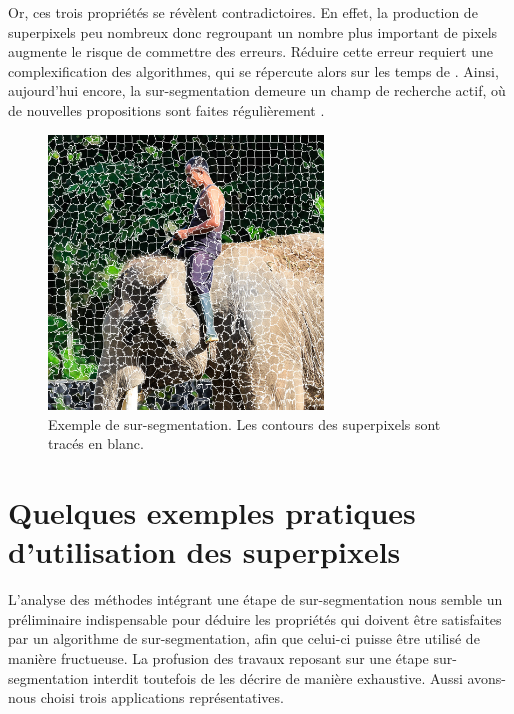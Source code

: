 Or, ces trois propriétés se révèlent contradictoires. En effet, la production de superpixels peu nombreux \modif{--} donc regroupant un nombre plus important de pixels \modif{--} augmente le risque de commettre des erreurs. Réduire cette erreur requiert une complexification des algorithmes, qui se répercute alors sur les temps de . Ainsi, aujourd'hui encore,  la sur-segmentation demeure un  champ de recherche actif, où de nouvelles propositions sont faites régulièrement \cite{achanta2012slic,conrad2013contour,machairas2015waterpixels}. 

\begin{figure}[htb]
	\centering
			\includegraphics[width=0.65\textwidth]{images/sur-segmentation/exempleSp}
		 \caption{Exemple de sur-segmentation. Les contours des superpixels sont tracés en blanc.}
		 \label{fig:sp_exempleSp}
\end{figure}


\section{Quelques exemples pratiques d'utilisation des superpixels}
L'analyse des méthodes intégrant une étape de sur-segmentation nous semble un préliminaire indispensable pour déduire les propriétés qui doivent être satisfaites par un algorithme de sur-segmentation, afin que celui-ci puisse être utilisé de manière fructueuse. La profusion des travaux reposant sur une étape sur-segmentation interdit toutefois de les décrire de manière exhaustive. Aussi avons-nous choisi trois applications représentatives.

